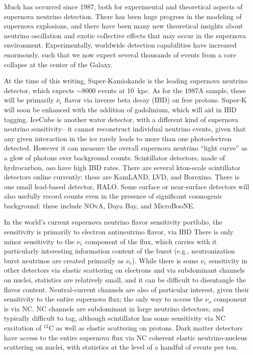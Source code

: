 Much has occurred since 1987, both for experimental and theoretical
aspects of supernova neutrino detection.
There has been huge progress in the modeling of supernova explosions,
and there have been many new theoretical insights about
neutrino oscillation and exotic collective effects that may occur in
the supernova environment.    Experimentally,
worldwide detection capabilities have increased enormously, such that
we now expect several thousands of events from a core collapse at the center
of the Galaxy.

At the time of this writing, Super-Kamiokande is the leading supernova
neutrino detector, which expects $\sim$8000 events at 10~kpc.  As for
the 1987A sample, these will be primarily $\bar{\nu}_e$ flavor via
inverse beta decay (IBD) on free protons.  Super-K will soon be
enhanced with the addition of gadolinium, which will aid in IBD
tagging.  IceCube is another water detector, with a different kind of
supernova neutrino sensitivity-- it cannot reconstruct individual
neutrino events, given that any given interaction in the ice rarely
leads to more than one photoelectron detected.  However it can measure
the overall supernova neutrino ``light curve'' as a glow of photons
over background counts.  Scintillator detectors, made of hydrocarbon,
aso have high IBD rates.  There are several kton-scale scintillator
detectors online currently: these are KamLAND, LVD, and Borexino.
There is one small lead-based detector, HALO.  Some surface or
near-surface detectors will also usefully record counts even in the
presence of significant cosmogenic background: these include NOvA,
Daya Bay, and MicroBooNE.

In the world's current supernova neutrino flavor sensitivity
portfolio, the sensitivity is primarily to electron antineutrino
flavor, via IBD There is only minor sensitivity to the $\nu_e$
component of the flux, which carries with it particularly interesting
information content of the burst (e.g., neutronization burst neutrinos
are created primarily as $\nu_e$).  While there is some $\nu_e$
sensitivity in other detectors via elastic scattering on electrons and
via subdominant channels on nuclei, statistics are relatively small,
and it can be difficult to disentangle the flavor content.
Neutral-current channels are also of particular interest, given their
sensitivity to the entire supernova flux; the only way to access the
$\nu_x$ component is via NC.  NC channels are subdominant in large
neutrino detectors, and typically difficult to tag, although
scintillator has some sensitivity via NC excitation of $^{12}$C as
well as elastic scattering on protons.  Dark matter detectors have
access to the entire supernova flux via NC coherent elastic
neutrino-nucleus scattering on nuclei, with statistics at the level of
a handful of events per ton.

